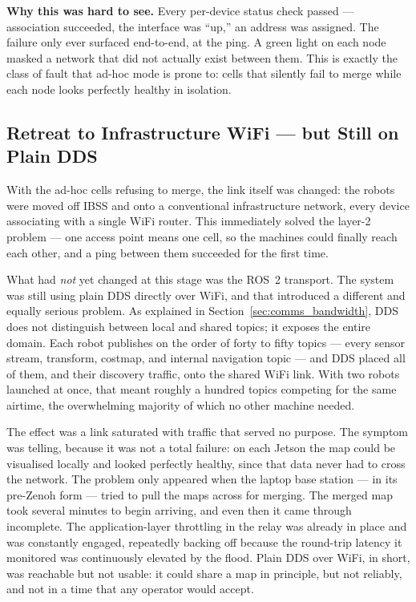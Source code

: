 \begin{notebox}
\textbf{Why this was hard to see.} Every per-device status check passed --- association succeeded, the interface was ``up,'' an address was assigned. The failure only ever surfaced end-to-end, at the ping. A green light on each node masked a network that did not actually exist between them. This is exactly the class of fault that ad-hoc mode is prone to: cells that silently fail to merge while each node looks perfectly healthy in isolation.
\end{notebox}

\subsection{Retreat to Infrastructure WiFi --- but Still on Plain DDS}
\label{subsec:plain_dds}

With the ad-hoc cells refusing to merge, the link itself was changed: the robots were moved off IBSS and onto a conventional infrastructure network, every device associating with a single WiFi router. This immediately solved the layer-2 problem --- one access point means one cell, so the machines could finally reach each other, and a ping between them succeeded for the first time.

What had \emph{not} yet changed at this stage was the ROS~2 transport. The system was still using plain DDS directly over WiFi, and that introduced a different and equally serious problem. As explained in Section~\ref{sec:comms_bandwidth}, DDS does not distinguish between local and shared topics; it exposes the entire domain. Each robot publishes on the order of forty to fifty topics --- every sensor stream, transform, costmap, and internal navigation topic --- and DDS placed all of them, and their discovery traffic, onto the shared WiFi link. With two robots launched at once, that meant roughly a hundred topics competing for the same airtime, the overwhelming majority of which no other machine needed.

The effect was a link saturated with traffic that served no purpose. The symptom was telling, because it was not a total failure: on each Jetson the map could be visualised locally and looked perfectly healthy, since that data never had to cross the network. The problem only appeared when the laptop base station --- in its pre-Zenoh form --- tried to pull the maps across for merging. The merged map took several minutes to begin arriving, and even then it came through incomplete. The application-layer throttling in the relay was already in place and was constantly engaged, repeatedly backing off because the round-trip latency it monitored was continuously elevated by the flood. Plain DDS over WiFi, in short, was reachable but not usable: it could share a map in principle, but not reliably, and not in a time that any operator would accept.

